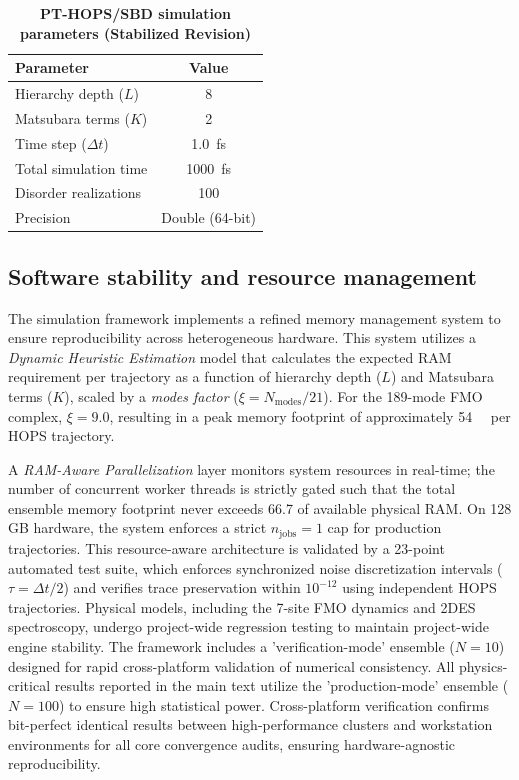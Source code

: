\documentclass[11pt,a4paper]{article}
\begin{document}
\begin{table}[h]
\centering
\caption{\textbf{PT-HOPS/SBD simulation parameters (Stabilized Revision)}}
\label{tab:SI_parameters}
\begin{tabular}{lc}
\toprule
\textbf{Parameter} & \textbf{Value} \\
\midrule
Hierarchy depth ($L$) & 8 \\
Matsubara terms ($K$) & 2 \\
Time step ($\Delta t$) & \SI{1.0}{\femto\second} \\
Total simulation time & \SI{1000}{\femto\second} \\
Disorder realizations & 100 \\
Precision & Double (64-bit) \\
\bottomrule
\end{tabular}
\end{table}

\subsection{Software stability and resource management}

The simulation framework implements a refined memory management system to ensure reproducibility across heterogeneous hardware. This system utilizes a \textit{Dynamic Heuristic Estimation} model that calculates the expected RAM requirement per trajectory as a function of hierarchy depth ($L$) and Matsubara terms ($K$), scaled by a \textit{modes factor} ($\xi = N_{\mathrm{modes}}/21$). For the 189-mode FMO complex, $\xi = 9.0$, resulting in a peak memory footprint of approximately \SI{54}{\giga\byte} per HOPS trajectory.

A \textit{RAM-Aware Parallelization} layer monitors system resources in real-time; the number of concurrent worker threads is strictly gated such that the total ensemble memory footprint never exceeds \num{66.7}{\percent} of available physical RAM. On 128 GB hardware, the system enforces a strict $n_{\mathrm{jobs}}=1$ cap for production trajectories. This resource-aware architecture is validated by a 23-point automated test suite, which enforces synchronized noise discretization intervals ($\tau = \Delta t/2$) and verifies trace preservation within $10^{-12}$ using independent HOPS trajectories. Physical models, including the 7-site FMO dynamics and 2DES spectroscopy, undergo project-wide regression testing to maintain project-wide engine stability. The framework includes a 'verification-mode' ensemble ($N=10$) designed for rapid cross-platform validation of numerical consistency. All physics-critical results reported in the main text utilize the 'production-mode' ensemble ($N=100$) to ensure high statistical power. Cross-platform verification confirms bit-perfect identical results between high-performance clusters and workstation environments for all core convergence audits, ensuring hardware-agnostic reproducibility.
\end{document}
